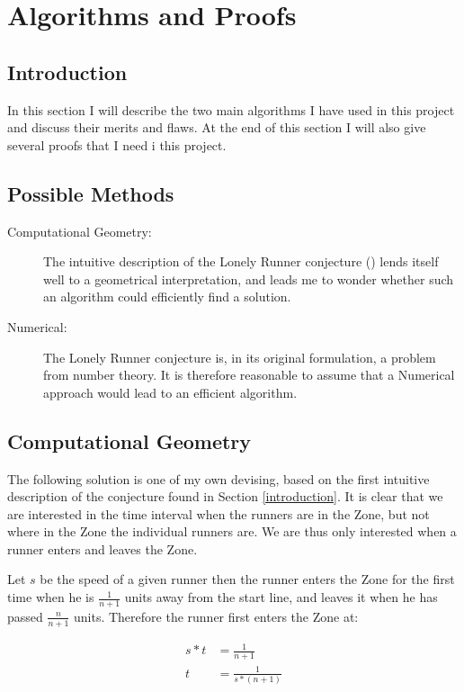 \section{Algorithms and Proofs}
\label{choiceOfMethod}

\subsection{Introduction}
In this section I will describe the two main algorithms I have used in this project and discuss their merits and flaws. At the end of this section I will also give several proofs that I need i this project.

\subsection{Possible Methods}

\begin{description}
\item[Computational Geometry:] The intuitive description of the Lonely Runner conjecture () lends itself well to a geometrical interpretation, and leads me to wonder whether such an algorithm could efficiently find a solution.

\item[Numerical:] The Lonely Runner conjecture is, in its original formulation, a problem from number theory. It is therefore reasonable to assume that a Numerical approach would lead to an efficient algorithm.
\end{description}

\subsection{Computational Geometry}
\label{compGeo}
The following solution is one of my own devising, based on the first intuitive description of the conjecture found in Section \ref{introduction}. It is clear that we are interested in the time interval when the runners are in the Zone, but not where in the Zone the individual runners are. We are thus only interested when a runner enters and leaves the Zone. 

Let $s$ be the speed of a given runner then the runner enters the Zone for the first time when he is $\frac{1}{n+1}$ units away from the start line, and leaves it when he has passed $\frac{n}{n+1}$ units.
Therefore the runner first enters the Zone at: 

\begin{equation}
\label{eqa:speedOne}
\begin{split}
s * t &= \frac{1}{n+1} \\
t &= \frac{1}{s * (n+1)}
\end{split}
\end{equation}

